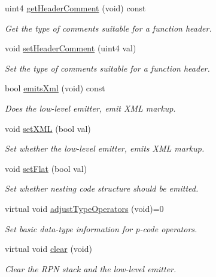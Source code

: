 \begin{DoxyCompactItemize}
uint4 \mbox{\hyperlink{class_print_language_a7bd125967537d3ba37ca4534818257b2}{get\+Header\+Comment}} (void) const
\begin{DoxyCompactList}\small\item\em Get the type of comments suitable for a function header. \end{DoxyCompactList}\item 
void \mbox{\hyperlink{class_print_language_a13a95cf52caabc9800a69e0a2bf90332}{set\+Header\+Comment}} (uint4 val)
\begin{DoxyCompactList}\small\item\em Set the type of comments suitable for a function header. \end{DoxyCompactList}\item 
bool \mbox{\hyperlink{class_print_language_a3a95b637e8095b550d81cbda9b25f9b1}{emits\+Xml}} (void) const
\begin{DoxyCompactList}\small\item\em Does the low-\/level emitter, emit X\+ML markup. \end{DoxyCompactList}\item 
void \mbox{\hyperlink{class_print_language_abec94ce8a6a2afb7daa0cc6bd6b222d8}{set\+X\+ML}} (bool val)
\begin{DoxyCompactList}\small\item\em Set whether the low-\/level emitter, emits X\+ML markup. \end{DoxyCompactList}\item 
void \mbox{\hyperlink{class_print_language_ae42187493b3b0458b84868ad55104f50}{set\+Flat}} (bool val)
\begin{DoxyCompactList}\small\item\em Set whether nesting code structure should be emitted. \end{DoxyCompactList}\item 
virtual void \mbox{\hyperlink{class_print_language_afe7b69e9583dfd99d310d7fbcb447986}{adjust\+Type\+Operators}} (void)=0
\begin{DoxyCompactList}\small\item\em Set basic data-\/type information for p-\/code operators. \end{DoxyCompactList}\item 
virtual void \mbox{\hyperlink{class_print_language_abfe1a661666d149f042b3240740da5f1}{clear}} (void)
\begin{DoxyCompactList}\small\item\em Clear the R\+PN stack and the low-\/level emitter. \end{DoxyCompactList}\item 

\end{DoxyCompactItemize}
